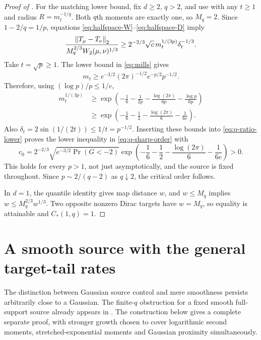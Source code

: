\documentclass[11pt]{article}
\numberwithin{equation}{section}
\theoremstyle{remark}\newtheorem{remark}[theorem]{Remark}
\begin{document}
\begin{proof}[Proof of ]
For the matching lower bound, fix $d\ge2$, $q>2$, and use  with any $t\ge1$ and radius $R=m_t^{-1/q}$. Both $q$th moments are exactly one, so $M_q=2$. Since $1-2/q=1/p$, equations \eqref{eq:halfspace-W}--\eqref{eq:halfspace-D} imply
\begin{equation}\label{eq:q-ratio-lower}
 \frac{\left\lVert T_\mu-T_\nu\right\rVert_2}{M_q^{2/3}W_2(\mu,\nu)^{1/3}}
 \ge2^{-2/3}\sqrt c\,m_t^{1/(3p)}\delta_t^{-1/3}.
\end{equation}
Take $t=\sqrt p\ge1$. The lower bound in \eqref{eq:mills} gives
\[
 m_t\ge e^{-3/2}(2\pi)^{-1/2}e^{-p/2}p^{-1/2}.
\]
Therefore, using $(\log p)/p\le1/e$,
\begin{align*}
 m_t^{1/(3p)}
 &\ge\exp\left(-\frac16-\frac1{2p}
                   -\frac{\log(2\pi)}{6p}-\frac{\log p}{6p}\right)\\
 &\ge\exp\left(-\frac16-\frac12-\frac{\log(2\pi)}6-\frac1{6e}\right).
\end{align*}
Also $\delta_t=2\sin(1/(2t))\le1/t=p^{-1/2}$. Inserting these bounds into \eqref{eq:q-ratio-lower} proves the lower inequality in \eqref{eq:q-sharp-order} with
\begin{equation}\label{eq:q-c0}
 c_0=2^{-2/3}\sqrt{e^{-3/2}\Pr(G<-2)}
 \exp\left(-\frac16-\frac12-\frac{\log(2\pi)}6-\frac1{6e}\right)>0.
\end{equation}
This holds for every $p>1$, not just asymptotically, and the source is fixed throughout. Since $p\sim2/(q-2)$ as $q\downarrow2$, the critical order follows.

In $d=1$, the quantile identity gives map distance $w$, and $w\le M_q$ implies $w\le M_q^{2/3}w^{1/3}$. Two opposite nonzero Dirac targets have $w=M_q$, so equality is attainable and $C_*(1,q)=1$.
\end{proof}

\section{A smooth source with the general target-tail rates}\label{sec:counterexample}
The distinction between Gaussian source control and mere smoothness persists arbitrarily close to a Gaussian. The finite-$q$ obstruction for a fixed smooth full-support source already appears in \cite[Theorem~6.1]{TailManuscriptV2}. The construction below gives a complete separate proof, with stronger growth chosen to cover logarithmic second moments, stretched-exponential moments and Gaussian proximity simultaneously.
\end{document}
